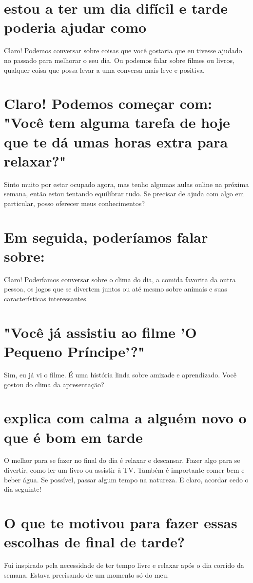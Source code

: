 \documentclass[11pt,a4paper]{article}
\begin{document}
\section{estou a ter um dia difícil e tarde poderia ajudar como}
Claro! Podemos conversar sobre coisas que você gostaria que eu tivesse ajudado no passado para melhorar o seu dia. Ou podemos falar sobre filmes ou livros, qualquer coisa que possa levar a uma conversa mais leve e positiva.

\section{Claro! Podemos começar com: "Você tem alguma tarefa de hoje que te dá umas horas extra para relaxar?"}
Sinto muito por estar ocupado agora, mas tenho algumas aulas online na próxima semana, então estou tentando equilibrar tudo. Se precisar de ajuda com algo em particular, posso oferecer meus conhecimentos?

\section{Em seguida, poderíamos falar sobre:}
Claro! Poderíamos conversar sobre o clima do dia, a comida favorita da outra pessoa, os jogos que se divertem juntos ou até mesmo sobre animais e suas características interessantes.

\section{"Você já assistiu ao filme 'O Pequeno Príncipe'?"}
Sim, eu já vi o filme. É uma história linda sobre amizade e aprendizado. Você gostou do clima da apresentação?

\section{explica com calma a alguém novo o que é bom em tarde}
O melhor para se fazer no final do dia é relaxar e descansar. Fazer algo para se divertir, como ler um livro ou assistir à TV. Também é importante comer bem e beber água. Se possível, passar algum tempo na natureza. E claro, acordar cedo o dia seguinte!

\section{O que te motivou para fazer essas escolhas de final de tarde?}
Fui inspirado pela necessidade de ter tempo livre e relaxar após o dia corrido da semana. Estava precisando de um momento só do meu.
\end{document}

